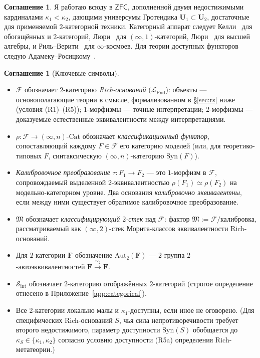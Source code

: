 \documentclass[11pt]{article}
\theoremstyle{plain}
\theoremstyle{definition}
\newtheorem{convention}[theorem]{Соглашение}
\newcommand{\cS}{\mathcal{S}}
\newcommand{\cF}{\mathcal{F}}
\newcommand{\fM}{\mathfrak{M}}
\newcommand{\LFnd}{\mathcal{L}_{\mathrm{Fnd}}}
\newcommand{\Sint}{\cS_{\mathrm{int}}}
\newcommand{\Cat}{\mathrm{Cat}}
\newcommand{\Syn}{\mathrm{Syn}}
\newcommand{\ZFC}{\mathsf{ZFC}}
\begin{document}
\begin{convention}\label{conv:zfc-inacc}
Я работаю всюду в $\ZFC$, дополненной двумя недостижимыми кардиналами $\kappa_1 < \kappa_2$, дающими универсумы Гротендика $\mathbf{U}_1 \subset \mathbf{U}_2$, достаточные для применяемой $2$-категорной техники. Категорный аппарат следует Келли~\cite{Kelly1982} для обогащённых и $2$-категорий, Люри~\cite{LurieHTT} для $(\infty, 1)$-категорий, Люри~\cite{LurieHA} для высшей алгебры, и Риль--Верити~\cite{RiehlVerity2022} для $\infty$-космоев. Для теории доступных функторов следую Адамеку--Росицкому~\cite{AdamekRosicky1994}.
\end{convention}

\begin{convention}[Ключевые символы]\label{conv:notation}
\begin{itemize}
\item $\cF$ обозначает $2$-категорию \emph{Rich-оснований} ($\LFnd$): объекты — основополагающие теории в смысле, формализованном в \S\ref{sec:rs} ниже (условия (R1)--(R5)); $1$-морфизмы — точные интерпретации; $2$-морфизмы — доказуемые естественные эквивалентности между интерпретациями.
\item $\rho : \cF \to (\infty, n)\text{-}\Cat$ обозначает \emph{классификационный функтор}, сопоставляющий каждому $F \in \cF$ его категорию моделей (или, для теоретико-типовых $F$, синтаксическую $(\infty, n)$-категорию $\Syn(F)$).
\item \emph{Калибровочное преобразование} $\tau : F_1 \to F_2$ — это $1$-морфизм в $\cF$, сопровождаемый выделенной $2$-эквивалентностью $\rho(F_1) \simeq \rho(F_2)$ на модельно-категорном уровне. Два основания \emph{калибровочно эквивалентны}, если между ними существует обратимое калибровочное преобразование.
\item $\fM$ обозначает \emph{классифицирующий $2$-стек} над $\cF$: фактор $\fM := \cF / \text{калибровка}$, рассматриваемый как $(\infty, 2)$-стек Морита-классов эквивалентности Rich-оснований.
\item Для $2$-категории $\mathbf{F}$ обозначение $\mathrm{Aut}_2(\mathbf{F})$ — $2$-группа $2$-автоэквивалентностей $\mathbf{F} \xrightarrow{\simeq_2} \mathbf{F}$.
\item $\Sint$ обозначает $2$-категорию отображённых $2$-категорий (строгое определение отнесено в Приложение~\ref{app:categorical}).
\item Все $2$-категории локально малы и $\kappa_1$-доступны, если иное не оговорено. (Для специфических Rich-оснований $S$, чья сила непротиворечивости требует второго недостижимого, параметр доступности $\Syn(S)$ обобщается до $\kappa_S \in \{\kappa_1, \kappa_2\}$ согласно условию доступности (R5a) определения Rich-метатеории.)
\end{itemize}
\end{convention}
\end{document}
